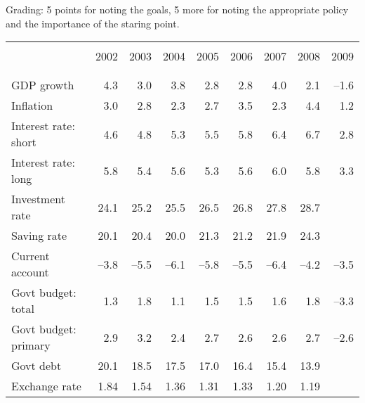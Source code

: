 \documentclass[letterpaper,12pt]{exam}
\begin{document}
\begin{enumerate}
\begin{enumerate}
Grading:  5 points for noting the goals, 5 more for noting
the appropriate policy and the importance of the staring point.  

\end{enumerate}

%
\begin{table}[h]
\vspace{1em}%
\centering%
\hspace{-6cm}%
\begin{minipage}
{0.52\textwidth}%
\begin{center}{\small
\begin{tabular}{lrrrrrrrr}%
\vspace{-0.6cm}\\
\hline%
\vspace{-.3cm}\\
    & 2002 & 2003 & 2004 & 2005 & 2006 &  2007 &  2008 & 2009 \\%
\vspace{-.3cm}\\
\hline%
\vspace{-.2cm}\\
GDP growth  & 4.3 & 3.0 & 3.8 & 2.8 & 2.8 & 4.0 & 2.1 
        & --1.6 \\
Inflation 
        & 3.0 & 2.8 & 2.3 & 2.7 & 3.5 & 2.3 & 4.4 & 1.2 \\
Interest rate:  short
        & 4.6 & 4.8 & 5.3 & 5.5 & 5.8 & 6.4 & 6.7 & 2.8 \\
Interest rate:  long 
        & 5.8 & 5.4 & 5.6 & 5.3 & 5.6 & 6.0 & 5.8 & 3.3 \\            
Investment rate    
        & 24.1 & 25.2 & 25.5 & 26.5 & 26.8 & 27.8 & 28.7 &  \\
Saving rate          
        & 20.1 & 20.4 & 20.0 & 21.3 & 21.2 & 21.9 & 24.3 &  \\
Current account 
        & --3.8 & --5.5 & --6.1 & --5.8 & --5.5 
        & --6.4 & --4.2 & --3.5 \\
Govt budget:  total
        & 1.3 & 1.8 & 1.1 & 1.5 & 1.5 & 1.6 & 1.8 & --3.3 \\
Govt budget:  primary 
        & 2.9 & 3.2 & 2.4 & 2.7 & 2.6 & 2.6 & 2.7 & --2.6 \\
Govt debt
        & 20.1 & 18.5 & 17.5 & 17.0 & 16.4 & 15.4 & 13.9  \\
Exchange rate 
        & 1.84 & 1.54 & 1.36 & 1.31 & 1.33 & 1.20 & 1.19 \\        

\end{tabular}}
\end{center}
\end{minipage}
\end{table}
\end{enumerate}
\end{document}

